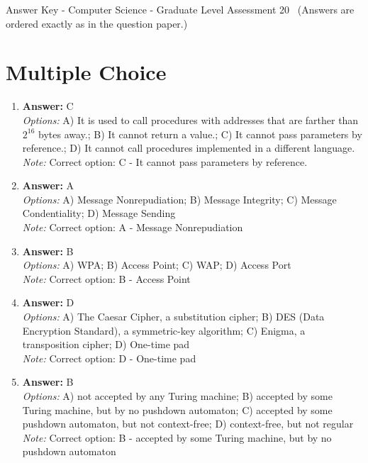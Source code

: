 \documentclass[12pt]{article}
\begin{document}
\begin{center}
Answer Key - Computer Science - Graduate Level Assessment 20 \
\small (Answers are ordered exactly as in the question paper.)
\end{center}

\section*{Multiple Choice}
\begin{enumerate}[label=\arabic*.]
\item \textbf{Answer:} C
\\ \textit{Options:} A) It is used to call procedures with addresses that are farther than $2^16$ bytes away.; B) It cannot return a value.; C) It cannot pass parameters by reference.; D) It cannot call procedures implemented in a different language.
\\ \textit{Note:} Correct option: C - It cannot pass parameters by reference.
\item \textbf{Answer:} A
\\ \textit{Options:} A) Message Nonrepudiation; B) Message Integrity; C) Message Condentiality; D) Message Sending
\\ \textit{Note:} Correct option: A - Message Nonrepudiation
\item \textbf{Answer:} B
\\ \textit{Options:} A) WPA; B) Access Point; C) WAP; D) Access Port
\\ \textit{Note:} Correct option: B - Access Point
\item \textbf{Answer:} D
\\ \textit{Options:} A) The Caesar Cipher, a substitution cipher; B) DES (Data Encryption Standard), a symmetric-key algorithm; C) Enigma, a transposition cipher; D) One-time pad
\\ \textit{Note:} Correct option: D - One-time pad
\item \textbf{Answer:} B
\\ \textit{Options:} A) not accepted by any Turing machine; B) accepted by some Turing machine, but by no pushdown automaton; C) accepted by some pushdown automaton, but not context-free; D) context-free, but not regular
\\ \textit{Note:} Correct option: B - accepted by some Turing machine, but by no pushdown automaton
\end{enumerate}
\end{document}
